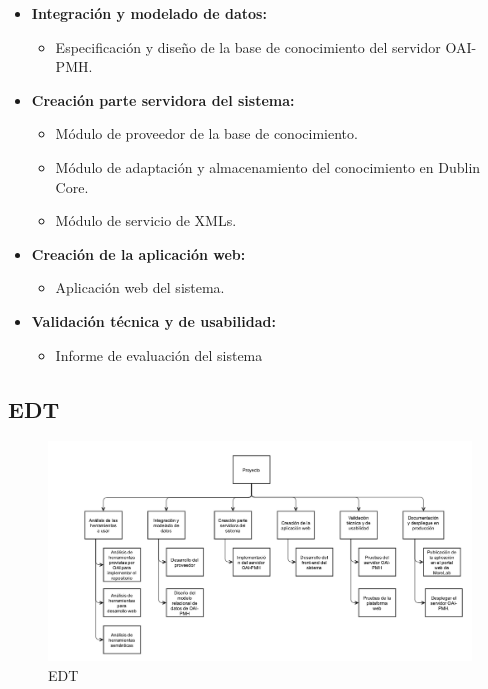 \begin{itemize}
	\item \textbf{Integración y modelado de datos:}
	\begin{itemize}
		\item Especificación y diseño de la base de conocimiento del servidor OAI-PMH.
	\end{itemize}
	\item \textbf{Creación parte servidora del sistema:}
	\begin{itemize}
		\item Módulo de proveedor de la base de conocimiento.
		\item Módulo de adaptación y almacenamiento del conocimiento en Dublin Core.
		\item Módulo de servicio de XMLs.
	\end{itemize}
	\item \textbf{Creación de la aplicación web:}
	\begin{itemize}
		\item Aplicación web del sistema.
	\end{itemize}
	\item \textbf{Validación técnica y de usabilidad:}
	\begin{itemize}
		\item Informe de evaluación del sistema
	\end{itemize}
\end{itemize}

\subsection{EDT}

\begin{figure}[!htp]
	\centering
	\includegraphics[angle=-90, scale=.5]{fig/edt}
	\caption{EDT}
\end{figure}

